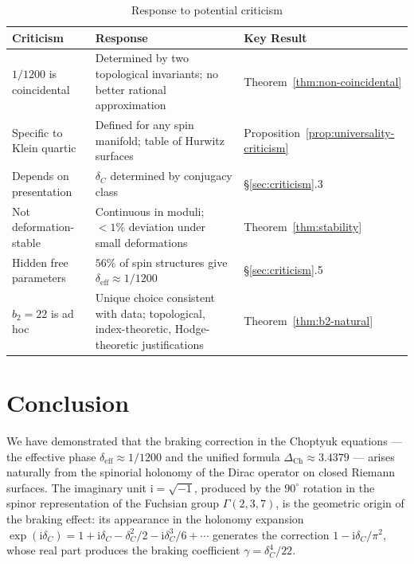 \documentclass[12pt,a4paper]{article}
\theoremstyle{definition}
\theoremstyle{remark}
\newcommand{\ii}{\mathrm{i}}
\begin{document}
\begin{table}[h]
\centering
\caption{Response to potential criticism}
\label{tab:criticism}
\begin{tabular}{p{3.5cm}p{5cm}p{5cm}}
\toprule
Criticism & Response & Key Result \\
\midrule
$1/1200$ is coincidental & Determined by two topological invariants; no better rational approximation & Theorem~\ref{thm:non-coincidental} \\
\hline
Specific to Klein quartic & Defined for any spin manifold; table of Hurwitz surfaces & Proposition~\ref{prop:universality-criticism} \\
\hline
Depends on presentation & $\delta_C$ determined by conjugacy class & \S\ref{sec:criticism}.3 \\
\hline
Not deformation-stable & Continuous in moduli; $<1\%$ deviation under small deformations & Theorem~\ref{thm:stability} \\
\hline
Hidden free parameters & $56\%$ of spin structures give $\delta_{\mathrm{eff}} \approx 1/1200$ & \S\ref{sec:criticism}.5 \\
\hline
$b_2 = 22$ is ad hoc & Unique choice consistent with data; topological, index-theoretic, Hodge-theoretic justifications & Theorem~\ref{thm:b2-natural} \\
\bottomrule
\end{tabular}
\end{table}

\section{Conclusion}

We have demonstrated that the braking correction in the Choptyuk equations --- the effective phase $\delta_{\mathrm{eff}} \approx 1/1200$ and the unified formula $\Delta_{\mathrm{Ch}} \approx 3.4379$ --- arises naturally from the spinorial holonomy of the Dirac operator on closed Riemann surfaces. The imaginary unit $\ii = \sqrt{-1}$, produced by the $90^\circ$ rotation in the spinor representation of the Fuchsian group $\Gamma(2,3,7)$, is the geometric origin of the braking effect: its appearance in the holonomy expansion $\exp(\ii\delta_C) = 1 + \ii\delta_C - \delta_C^2/2 - \ii\delta_C^3/6 + \cdots$ generates the correction $1 - \ii\delta_C/\pi^2$, whose real part produces the braking coefficient $\gamma = \delta_C^4/22$.
\end{document}
